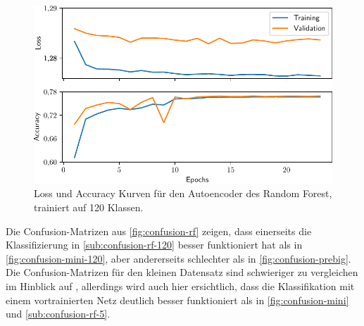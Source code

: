 \begin{figure}
  \centering
  \includegraphics[scale=0.8]{pics/ergebnisse/RF/history.pdf}
  \caption{Loss und Accuracy Kurven für den Autoencoder des Random Forest,
  trainiert auf 120 Klassen.}
  \label{fig:loss-acc-rf}
\end{figure}

Die Confusion-Matrizen aus \autoref{fig:confusion-rf} zeigen, dass einerseits
die Klassifizierung in \autoref{sub:confusion-rf-120} besser funktioniert hat
als in \autoref{fig:confusion-mini-120}, aber andererseits schlechter als in
\autoref{fig:confusion-prebig}. Die Confusion-Matrizen für den kleinen Datensatz
sind schwieriger zu vergleichen im Hinblick auf \MiniDog, allerdings wird auch
hier ersichtlich, dass die Klassifikation mit einem vortrainierten Netz deutlich
besser funktioniert als in \autoref{fig:confusion-mini} und
\autoref{sub:confusion-rf-5}.

